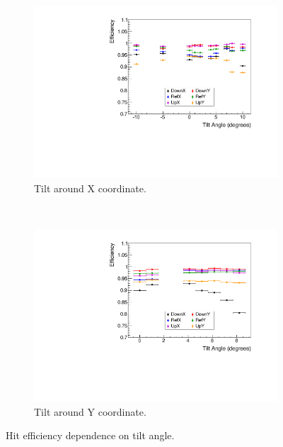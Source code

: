 \documentclass[a4paper,11pt]{article}
\begin{document}
\begin{figure}[h!]
        \centering
         \begin{subfigure}[b]{0.45\textwidth}
   	\includegraphics[keepaspectratio=true, width=\textwidth]{Figures/mgr_eff_tiltX.pdf}
	\caption{Tilt around X coordinate.}
	\label{eff-X}
        \end{subfigure}
         ~
         \begin{subfigure}[b]{0.45\textwidth}
        \centering
   	\includegraphics[keepaspectratio=true, width=\textwidth]{Figures/mgr_eff_tiltY.pdf}
	\caption{Tilt around Y coordinate.}
                \label{eff-Y}
        \end{subfigure}
         \caption{Hit efficiency dependence on tilt angle.}
        \label{eff}
\end{figure}
\end{document}
